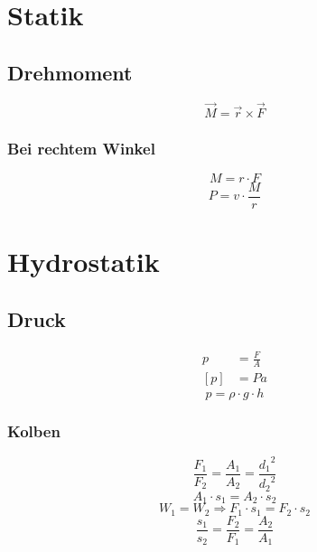 \documentclass[a4paper]{IEEEtran}
\begin{document}
  \section{Statik}
  \subsection{Drehmoment}
  \begin{equation}
    \vec{M} = \vec{r} \times \vec{F}
  \end{equation}
  \subsubsection{Bei rechtem Winkel}
  \begin{equation}
    M = r \cdot F
  \end{equation}
  \begin{equation}
    P = v \cdot \frac{M}{r}
  \end{equation}

  \section{Hydrostatik}
  \subsection{Druck}
  \begin{align}
    p &= \frac{F}{A} \\
    [p] &= Pa
  \end{align}
  \begin{equation}
    p = \rho \cdot g \cdot h
  \end{equation}
  
  \subsubsection{Kolben}
  \begin{equation}
    \frac{F_1}{F_2} = \frac{A_1}{A_2} = \frac{{d_1}^2}{{d_2}^2}    
  \end{equation}
  \begin{equation}
    A_1 \cdot s_1 = A_2 \cdot s_2
  \end{equation}
  \begin{equation}
    W_1 = W_2 \Rightarrow F_1 \cdot s_1 = F_2 \cdot s_2
  \end{equation}
  \begin{equation}
    \frac{s_1}{s_2} = \frac{F_2}{F_1} = \frac{A_2}{A_1} 
  \end{equation}
\end{document}
